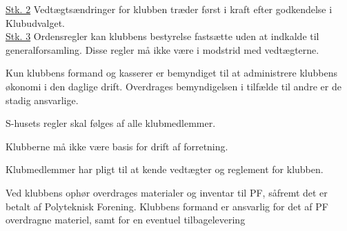 \begin{list}
\underline{Stk. 2} Vedtægtsændringer for klubben træder først i kraft efter godkendelse i Klubudvalget.\\

\underline{Stk. 3} Ordensregler kan klubbens bestyrelse fastsætte uden at indkalde til generalforsamling. Disse regler må ikke være i modstrid med vedtægterne.
\item Kun klubbens formand og kasserer er bemyndiget til at administrere klubbens økonomi i den daglige drift. Overdrages bemyndigelsen i tilfælde til andre er de stadig ansvarlige.
\item S-husets regler skal følges af alle klubmedlemmer.
\item Klubberne må ikke være basis for drift af forretning.
\item Klubmedlemmer har pligt til at kende vedtægter og reglement for klubben.
\item Ved klubbens ophør overdrages materialer og inventar til PF, såfremt det er betalt af Polyteknisk Forening. Klubbens formand er ansvarlig for det af PF overdragne materiel, samt for en eventuel tilbagelevering
\end{list}